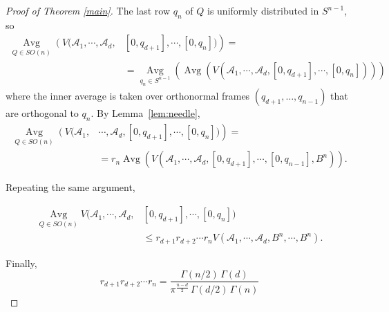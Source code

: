 \documentclass{amsart}
\theoremstyle{definition}
\theoremstyle{remark}
\begin{document}
\begin{proof}[Proof of Theorem \ref{main}]
The last row $q_n$ of $Q$ is uniformly distributed in $S^{n-1}$,
so
\[
\begin{split}
{\operatorname*{Avg}_{{Q \in SO(n)}}} 
\left( V(\mathcal A_1,\right.\left. \cdots, \mathcal A_d,\right.&\left. [0,q_{d+1}], \cdots, [0,q_n]) 
\right)=
\\
&={\operatorname*{Avg}_{{q_n \in S^{n-1}}}} \left( 
{\operatorname*{Avg}_{{}}}
\left(
V(\mathcal A_1, \cdots, \mathcal A_d, [0,q_{d+1}], \cdots, [0,q_n]) 
\right) \right)
\end{split}
\]
where the inner average is taken over orthonormal frames $(q_{d+1}, \dots, q_{n-1})$
that are orthogonal to $q_n$.
By Lemma~\ref{lem:needle},
\[
\begin{split}
{\operatorname*{Avg}_{{Q \in SO(n)}}} 
\left( V(\mathcal A_1,\right.&\left. \cdots, \mathcal A_d, [0,q_{d+1}], \cdots, [0,q_n]) 
\right)=
\\
&=
r_{n} 
{\operatorname*{Avg}_{{}}}
\left(
V(\mathcal A_1, \cdots, \mathcal A_d, [0,q_{d+1}], \cdots, [0,q_{n-1}], B^n) 
\right).
\end{split}
\]

Repeating the same argument, 

\[
\begin{split}
{\operatorname*{Avg}_{{Q \in SO(n)}}} V(\mathcal A_1, \cdots, \mathcal A_d, &  [0,q_{d+1}], \cdots, [0,q_n]) 
\\
&\le
r_{d+1} r_{d+2} \cdots r_n 
V(\mathcal A_1, \cdots, \mathcal A_d, B^n, \cdots, B^n) 
.
\end{split}
\]

Finally,
\[
r_{d+1} r_{d+2} \cdots r_n 
=
\frac{\Gamma(n/2)\, \Gamma(d)}{\pi^{\frac{n-d}{2}}\, \Gamma(d/2)\, \Gamma(n)}
\]
\end{proof}

\begin{bibsection}
\begin{biblist}


\end{biblist}
\end{bibsection}
\end{document}

